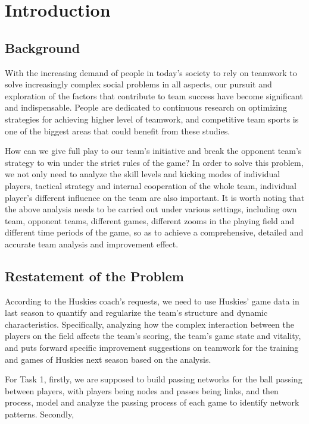 \documentclass{mcmthesis}
\begin{document}
\newpage

\section{Introduction}

	\subsection{Background}
	With the increasing demand of people in today's society to rely on teamwork to solve increasingly complex social problems in all aspects, our pursuit and exploration of the factors that contribute to team success have become significant and indispensable. People are dedicated to continuous research on optimizing strategies for achieving higher level of teamwork, and competitive team sports is one of the biggest areas that could benefit from these studies. 

	How can we give full play to our team's initiative and break the opponent team’s strategy to win under the strict rules of the game? In order to solve this problem, we not only need to analyze the skill levels and kicking modes of individual players, tactical strategy and internal cooperation of the whole team, individual player's different influence on the team are also important. It is worth noting that the above analysis needs to be carried out under various settings, including own team, opponent teams, different games, different zooms in the playing field and different time periods of the game, so as to achieve a comprehensive, detailed and accurate team analysis and improvement effect.

	\subsection{Restatement of the Problem}
	According to the Huskies coach’s requests, we need to use Huskies’ game data in last season to quantify and regularize the team's structure and dynamic characteristics. Specifically, analyzing how the complex interaction between the players on the field affects the team's scoring, the team's game state and vitality, and puts forward specific improvement suggestions on teamwork for the training and games of Huskies next season based on the analysis.
	
	For Task 1, firstly, we are supposed to build passing networks for the ball passing between players, with players being nodes and passes being links, and then process, model and analyze the passing process of each game to identify network patterns. Secondly, 
	
\end{document}
